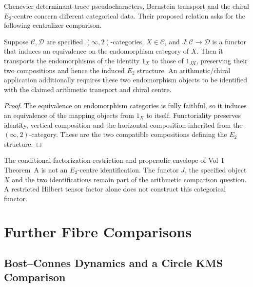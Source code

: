 Chenevier determinant-trace pseudocharacters, Bernstein transport
and the chiral $E_2$-centre concern different categorical data.
Their proposed relation asks for the following centralizer comparison.
\begin{proposition}
\label{v4-arith:w6-i:thm:W5-H-alignment}
Suppose $\mathcal C,\mathcal D$ are specified $(\infty,2)$-categories,
$X\in\mathcal C$, and $J:\mathcal C\to\mathcal D$ is a functor
that induces an equivalence on the endomorphism category of $X$.
Then it transports the endomorphisms of the identity $1_X$ to those
of $1_{JX}$, preserving their two compositions and hence the induced
$E_2$ structure. An arithmetic/chiral application additionally
requires these two endomorphism objects to be identified with the
claimed arithmetic transport and chiral centre.
\end{proposition}
\begin{proof}
The equivalence on endomorphism categories is fully faithful, so
it induces an equivalence of the mapping objects from $1_X$ to itself.
Functoriality preserves identity, vertical composition and the
horizontal composition inherited from the $(\infty,2)$-category.
These are the two compatible compositions defining the $E_2$ structure.
\end{proof}
The conditional factorization restriction and properadic envelope
of Vol~I Theorem~A is not an $E_2$-centre identification.
The functor $J$, the specified object $X$ and the two identifications
remain part of the arithmetic comparison question. A restricted
Hilbert tensor factor alone does not construct this categorical functor.

\section{Further Fibre Comparisons}
\label{v4-arith:w6-i:restrictions}

\subsection{Bost--Connes Dynamics and a Circle KMS Comparison}
\label{v4-arith:w6-i:W5-B-alignment}

